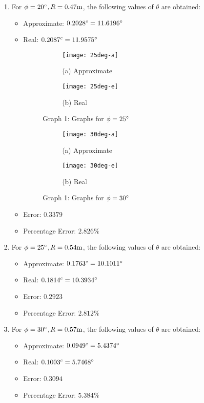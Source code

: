   \begin{enumerate}
  \item For $\phi=20\degree, R=0.47 \mathrm{m}$, the following values of $\theta$ are obtained:
    \begin{itemize}
    \item Approximate: $0.2028^c = 11.6196\degree$
    \item Real: $0.2087^c = 11.9575\degree$
      \cleartoleftpage
       \vspace*{1cm}
  \begin{figure}[!htb]
    \begin{subfigure}{9cm}
      \texttt{[image: 25deg-a]}
      \caption*{(a) Approximate}
    \end{subfigure}
    \begin{subfigure}{9cm}
      \texttt{[image: 25deg-e]}
      \caption*{(b) Real}
    \end{subfigure}
    \caption*{Graph 1: Graphs for $\phi = 25\degree$}
  \end{figure}
\vspace*{2cm}
  \begin{figure}[!htb]
    \begin{subfigure}{9cm}
      \texttt{[image: 30deg-a]}
      \caption*{(a) Approximate}
    \end{subfigure}
    \begin{subfigure}{9cm}
      \texttt{[image: 30deg-e]}
      \caption*{(b) Real}
    \end{subfigure}
    \caption*{Graph 1: Graphs for $\phi = 30\degree$}
    \end{figure}
      \cleardoublepage
    \item Error: $0.3379$
    \item Percentage Error: $2.826 \%$ 
    \end{itemize}
  \item For $\phi=25\degree, R=0.54 \mathrm{m}$, the following values of $\theta$ are obtained:
    \begin{itemize}
    \item Approximate: $0.1763^c = 10.1011\degree$
    \item Real: $0.1814^c = 10.3934\degree$
      \item Error: $0.2923$
      \item Percentage Error: $2.812 \%$
    \end{itemize}
  \item For $\phi=30\degree, R=0.57 \mathrm{m}$, the following values of $\theta$ are obtained:
    \begin{itemize}
    \item Approximate: $0.0949^c = 5.4374\degree$
    \item Real: $0.1003^c = 5.7468\degree$
      \item Error: $0.3094$
    \item Percentage Error: $5.384 \%$
      \end{itemize}
  \end{enumerate}
